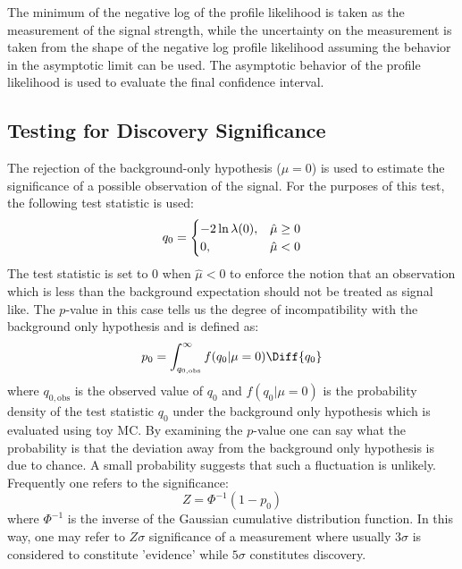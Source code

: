 The minimum of the negative log of the profile likelihood 
is taken as the measurement of the signal strength, while
the uncertainty on the measurement is taken from the shape of the 
negative log profile likelihood assuming the behavior in the asymptotic
limit can be used.  The asymptotic behavior of the profile likelihood 
is used to evaluate the final confidence interval. 


\subsection{Testing for Discovery Significance}
The rejection of the background-only hypothesis ($\mu = 0$) is used to estimate the significance of a possible observation of the signal.
For the purposes of this test, the following test 
statistic is used:
\begin{equation}
q_{0} = 
\begin{cases}
\hfill -2 \ln \lambda(0),\hfill & \hat{\mu} \geq 0 \\
0,\hfill & \hat{\mu} < 0
\end{cases}
\label{eq:q0}
\end{equation}
The test statistic is set to $0$ when $\hat{\mu} < 0$ to enforce
the notion that an observation which is less than the background
expectation should not be treated as signal like. The $p$-value in this case
tells us the degree of incompatibility with the background only hypothesis
and is defined as:
\begin{equation}
p_0=\int^{\infty }_{q_{0,\textrm{obs}}} f(q_0|\mu=0) \Diff{q_0}
\label{eq:pvalue}
\end{equation}
where $q_{0,\textrm{obs}}$ is the observed value of $q_0$ and 
$f(q_0|\mu=0)$ is the probability density of the test statistic $q_0$ under
the background only hypothesis which is evaluated using toy MC. %
By examining the $p$-value one can say what the probability is 
that the deviation away from the background only hypothesis is due
to chance. A small probability suggests that such a fluctuation is
unlikely. Frequently one refers to the significance:
\begin{equation}
Z = \Phi^{-1}(1-p_0)
\label{eq:significance}
\end{equation}
where $\Phi^{-1}$ is the inverse of the Gaussian cumulative distribution function.
In this way, one may refer to $Z\sigma$ significance of a measurement where usually
$3\sigma$ is considered to constitute 'evidence' while $5\sigma$ constitutes
discovery.

